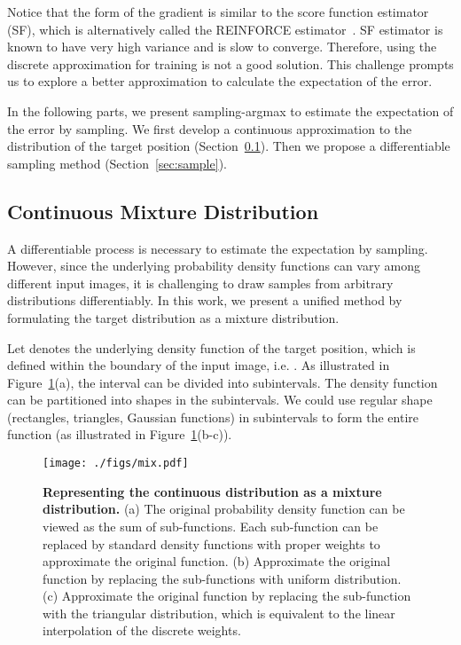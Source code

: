 \documentclass{article}
\begin{document}
Notice that the form of the gradient is similar to the score function estimator (SF), which is alternatively called the REINFORCE estimator~\cite{williams1992simple}. SF estimator is known to have very high variance and is slow to converge. Therefore, using the discrete approximation for training is not a good solution. This challenge prompts us to explore a better approximation to calculate the expectation of the error.

In the following parts, we present sampling-argmax to estimate the expectation of the error by sampling. We first develop a continuous approximation to the distribution of the target position (Section~\ref{sec:continuous}). Then we propose a differentiable sampling method (Section~\ref{sec:sample}).




\subsection{Continuous Mixture Distribution}\label{sec:continuous}






A differentiable process is necessary to estimate the expectation by sampling. However, since the underlying probability density functions can vary among different input images, it is challenging to draw samples from arbitrary distributions differentiably. In this work, we present a unified method by formulating the target distribution as a mixture distribution.

Let  denotes the underlying density function of the target position, which is defined within the boundary of the input image, i.e. . As illustrated in Figure~\ref{fig:distribution}(a), the interval  can be divided into  subintervals. The density function can be partitioned into shapes in the subintervals. We could use regular shape (rectangles, triangles, Gaussian functions) in subintervals to form the entire function (as illustrated in Figure~\ref{fig:distribution}(b-c)).


\begin{figure}[t]
    \centering
    \texttt{[image: ./figs/mix.pdf]}
    \caption{\textbf{Representing the continuous distribution as a mixture distribution.} (a) The original probability density function can be viewed as the sum of  sub-functions. Each sub-function can be replaced by standard density functions with proper weights to approximate the original function. (b) Approximate the original function by replacing the sub-functions with uniform distribution. (c) Approximate the original function by replacing the sub-function with the triangular distribution, which is equivalent to the linear interpolation of the discrete weights.}
    \label{fig:distribution}
\end{figure}
\end{document}
